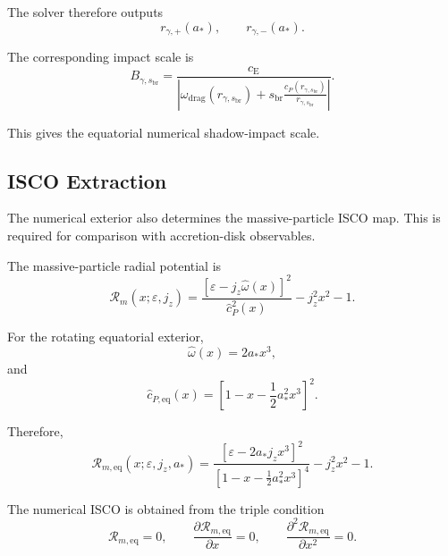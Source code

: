 The solver therefore outputs
\begin{equation}
    \boxed{ r_{\gamma,+}(a_\ast), \qquad r_{\gamma,-}(a_\ast). }
\end{equation}

The corresponding impact scale is
\begin{equation}
    \boxed{ B_{\gamma,s_{\mathrm{br}}} = \frac{ c_{\mathrm{E}} }{ \left| \omega_{\mathrm{drag}}(r_{\gamma,s_{\mathrm{br}}}) + s_{\mathrm{br}} \frac{c_P(r_{\gamma,s_{\mathrm{br}}})}{r_{\gamma,s_{\mathrm{br}}}} \right| }. }
\end{equation}

This gives the equatorial numerical shadow-impact scale.

\subsection{ISCO Extraction}

The numerical exterior also determines the massive-particle ISCO map. This is required for comparison with accretion-disk observables.

The massive-particle radial potential is
\begin{equation}
    \mathcal{R}_m(x;\varepsilon,j_z) = \frac{ \left[ \varepsilon - j_z\widehat{\omega}(x) \right]^2 }{ \widehat{c}_P^2(x) } - j_z^2x^2 - 1.
\end{equation}

For the rotating equatorial exterior,
\begin{equation}
    \widehat{\omega}(x) = 2a_\ast x^3,
\end{equation}
and
\begin{equation}
    \widehat{c}_{P,\mathrm{eq}}(x) = \left[ 1 - x - \frac{1}{2}a_\ast^2x^3 \right]^2.
\end{equation}

Therefore,
\begin{equation}
    \mathcal{R}_{m,\mathrm{eq}}(x;\varepsilon,j_z,a_\ast) = \frac{ \left[ \varepsilon - 2a_\ast j_z x^3 \right]^2 }{ \left[ 1 - x - \frac{1}{2}a_\ast^2x^3 \right]^4 } - j_z^2x^2 - 1.
\end{equation}

The numerical ISCO is obtained from the triple condition
\begin{equation}
    \boxed{ \mathcal{R}_{m,\mathrm{eq}} = 0, \qquad \frac{\partial\mathcal{R}_{m,\mathrm{eq}}}{\partial x} = 0, \qquad \frac{\partial^2\mathcal{R}_{m,\mathrm{eq}}}{\partial x^2} = 0. }
\end{equation}

